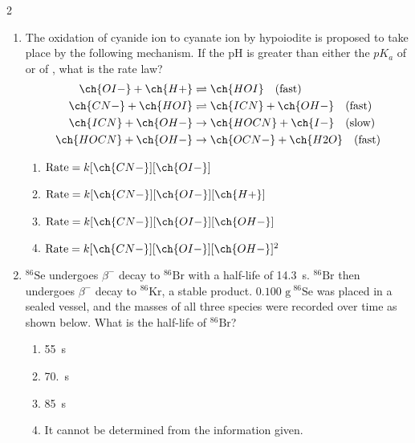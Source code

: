 \documentclass[titlepage,10pt,letterpaper]{article}
\begin{document}
\begin{multicols}{2}
\begin{enumerate}[leftmargin=*,resume]
\item The oxidation of cyanide ion to cyanate ion by hypoiodite is proposed to take place by the following mechanism. If the pH is greater than either the $pK_a$ of  or of , what is the rate law?
\begin{align*}
    \ch{OI-} + \ch{H+} &\rightleftharpoons \ch{HOI} \quad \text{(fast)} \\
    \ch{CN-} + \ch{HOI} &\rightleftharpoons \ch{ICN} + \ch{OH-} \quad \text{(fast)} \\
    \ch{ICN} + \ch{OH-} &\rightarrow \ch{HOCN} + \ch{I-} \quad \text{(slow)} \\
    \ch{HOCN} + \ch{OH-} &\rightarrow \ch{OCN-} + \ch{H2O} \quad \text{(fast)}
\end{align*}
\begin{enumerate}[label=(\alph*)]
    \item $\text{Rate} = k[\ch{CN-}][\ch{OI-}]$
    \item $\text{Rate} = k[\ch{CN-}][\ch{OI-}][\ch{H+}]$
    \item $\text{Rate} = k[\ch{CN-}][\ch{OI-}][\ch{OH-}]$
    \item $\text{Rate} = k[\ch{CN-}][\ch{OI-}][\ch{OH-}]^2$
\end{enumerate}

\item $^{86}\text{Se}$ undergoes $\beta^-$ decay to $^{86}\text{Br}$ with a half-life of 14.3~s. $^{86}\text{Br}$ then undergoes $\beta^-$ decay to $^{86}\text{Kr}$, a stable product. $0.100\text{ g}\ ^{86}\text{Se}$ was placed in a sealed vessel, and the masses of all three species were recorded over time as shown below. What is the half-life of $^{86}\text{Br}$?
\begin{center}
\end{center}
\begin{enumerate}[label=(a)]
    \item 55~s
    \item 70.~s
    \item 85~s
    \item It cannot be determined from the information given.
\end{enumerate}


\end{enumerate}
\end{multicols}
\end{document}
